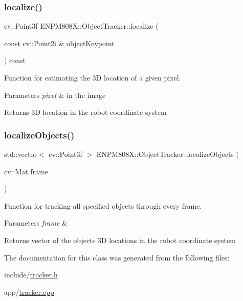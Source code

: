 \subsubsection{\texorpdfstring{localize()}{localize()}}
{\footnotesize\ttfamily cv\+::\+Point3f E\+N\+P\+M808\+X\+::\+Object\+Tracker\+::localize (\begin{DoxyParamCaption}\item[{const cv\+::\+Point2i \&}]{object\+Keypoint }\end{DoxyParamCaption}) const}



Function for estimating the 3D location of a given pixel. 


\begin{DoxyParams}{Parameters}
{\em pixel} & in the image \\
\hline
\end{DoxyParams}
\begin{DoxyReturn}{Returns}
3D location in the robot coordinate system 
\end{DoxyReturn}
\mbox{\label{class_e_n_p_m808_x_1_1_object_tracker_aaabe274d63cce01922a9c1a834a52039}} 
\subsubsection{\texorpdfstring{localize\+Objects()}{localizeObjects()}}
{\footnotesize\ttfamily std\+::vector$<$ cv\+::\+Point3f $>$ E\+N\+P\+M808\+X\+::\+Object\+Tracker\+::localize\+Objects (\begin{DoxyParamCaption}\item[{cv\+::\+Mat}]{frame }\end{DoxyParamCaption})}



Function for tracking all specified objects through every frame. 


\begin{DoxyParams}{Parameters}
{\em frame} & \\
\hline
\end{DoxyParams}
\begin{DoxyReturn}{Returns}
vector of the objects\textquotesingle{} 3D locations in the robot coordinate system 
\end{DoxyReturn}


The documentation for this class was generated from the following files\+:\begin{DoxyCompactItemize}
\item 
include/\hyperlink{tracker_8h}{tracker.\+h}\item 
app/\hyperlink{tracker_8cpp}{tracker.\+cpp}\end{DoxyCompactItemize}
